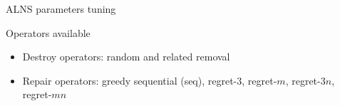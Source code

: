 \documentclass[9pt,xcolor={dvipsnames}]{beamer}
\begin{document}

\begin{frame}{ALNS parameters tuning}
	\begin{block}{Operators available}
		\begin{itemize}
 \setlength{\parskip}{0pt} 
 \setlength{\itemsep}{0pt plus 1pt}
			\item Destroy operators: random and related removal
			\item Repair operators: greedy sequential (seq), regret-$3$, regret-$m$, regret-$3n$, regret-$mn$
		\end{itemize}
	\end{block}
	
\end{frame}
\end{document}

